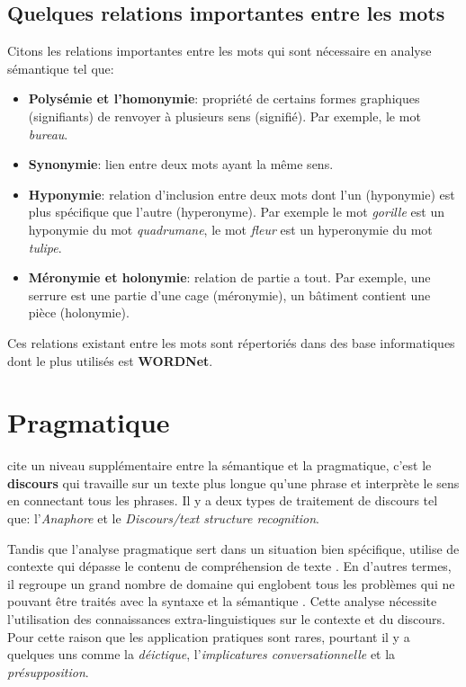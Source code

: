 \subsection*{Quelques relations importantes entre les mots}
Citons les relations importantes entre les mots \citep{automatic-nlp} qui sont nécessaire en analyse sémantique tel que:
\begin{itemize}
    \item \textbf{Polysémie et l'homonymie}: propriété de certains formes graphiques (signifiants) de renvoyer à plusieurs sens (signifié). Par exemple, le mot \textit{bureau}.
    \item \textbf{Synonymie}: lien entre deux mots ayant la même sens.
    \item \textbf{Hyponymie}: relation d'inclusion entre deux mots dont l'un (hyponymie) est plus spécifique que l'autre (hyperonyme). Par exemple le mot \textit{gorille} est un hyponymie du mot \textit{quadrumane}, le mot \textit{fleur} est un hyperonymie du mot \textit{tulipe}.
    \item \textbf{Méronymie et holonymie}: relation de partie a tout. Par exemple, une serrure est une partie d'une cage (méronymie), un bâtiment contient une pièce (holonymie).
\end{itemize}

Ces relations existant entre les mots sont répertoriés dans des base informatiques dont le plus utilisés est \textbf{WORDNet}.

\section{Pragmatique}
\citeauthor{natural-language-processing} cite un niveau supplémentaire entre la sémantique et la pragmatique, c'est le \textbf{discours} qui travaille sur un texte plus longue qu'une phrase et interprète le sens en connectant tous les phrases. Il y a deux types de traitement de discours tel que: l'\textit{Anaphore} et le \textit{Discours/text structure recognition}.

Tandis que l'analyse pragmatique sert dans un situation bien spécifique, utilise de contexte qui dépasse le contenu de compréhension de texte \citep{natural-language-processing}. En d'autres termes, il regroupe un grand nombre de domaine qui englobent tous les problèmes qui ne pouvant être traités avec la syntaxe et la sémantique \citep{automatic-nlp}. Cette analyse nécessite l'utilisation des connaissances extra-linguistiques sur le contexte et du discours. Pour cette raison que les application pratiques sont rares, pourtant il y a quelques uns \citep{automatic-nlp} comme la \textit{déictique}, l'\textit{implicatures conversationnelle} et la \textit{présupposition}.

